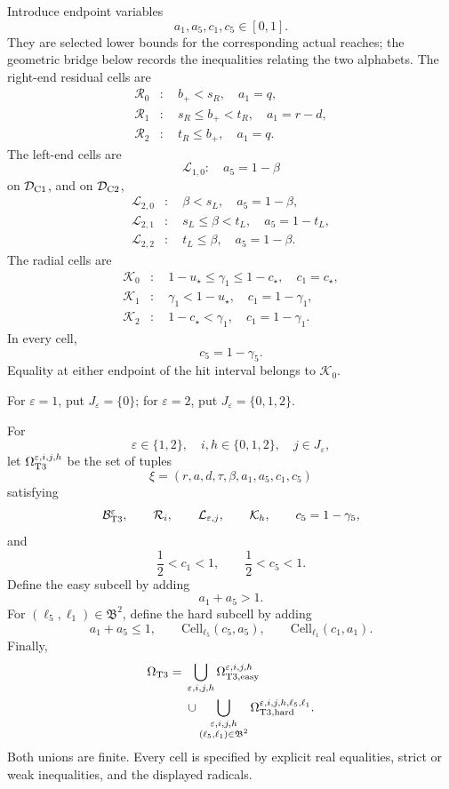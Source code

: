 Introduce endpoint variables
\[
 a_1,a_5,c_1,c_5\in[0,1].
\]
They are selected lower bounds for the corresponding actual reaches; the
geometric bridge below records the inequalities relating the two alphabets.
The right-end residual cells are
\[
 \begin{aligned}
 \mathcal R_0&:\quad b_+<s_R,\quad a_1=q,\\
 \mathcal R_1&:\quad s_R\le b_+<t_R,\quad a_1=r-d,\\
 \mathcal R_2&:\quad t_R\le b_+,\quad a_1=q.
 \end{aligned}
\]
The left-end cells are
\[
 \mathcal L_{1,0}:\quad a_5=1-\beta
\]
on \(\mathcal D_{\rm C1}\), and on \(\mathcal D_{\rm C2}\),
\[
 \begin{aligned}
 \mathcal L_{2,0}&:\quad \beta<s_L,\quad a_5=1-\beta,\\
 \mathcal L_{2,1}&:\quad s_L\le\beta<t_L,\quad a_5=1-t_L,\\
 \mathcal L_{2,2}&:\quad t_L\le\beta,\quad a_5=1-\beta.
 \end{aligned}
\]
The radial cells are
\[
 \begin{aligned}
 \mathcal K_0&:\quad
 1-u_\star\le\gamma_1\le1-c_\star,\quad c_1=c_\star,\\
 \mathcal K_1&:\quad
 \gamma_1<1-u_\star,\quad c_1=1-\gamma_1,\\
 \mathcal K_2&:\quad
 1-c_\star<\gamma_1,\quad c_1=1-\gamma_1.
 \end{aligned}
\]
In every cell,
\[
 c_5=1-\gamma_5.
\]
Equality at either endpoint of the hit interval belongs to \(\mathcal K_0\).

For \(\varepsilon=1\), put \(J_\varepsilon=\{0\}\); for
\(\varepsilon=2\), put \(J_\varepsilon=\{0,1,2\}\).

\begin{definition}
\label{def:s2-t3-finite-union}
For
\[
 \varepsilon\in\{1,2\},\quad
 i,h\in\{0,1,2\},\quad
 j\in J_\varepsilon,
\]
let \(\Omega_{\rm T3}^{\varepsilon,i,j,h}\) be the set of tuples
\[
 \xi=(r,a,d,\tau,\beta,a_1,a_5,c_1,c_5)
\]
satisfying
\[
 \mathcal B_{\rm T3}^{\varepsilon},
 \qquad
 \mathcal R_i,\qquad
 \mathcal L_{\varepsilon,j},\qquad
 \mathcal K_h,\qquad
 c_5=1-\gamma_5,
\]
and
\[
 \frac12<c_1<1,\qquad
 \frac12<c_5<1.
\]
Define the easy subcell by adding
\[
 a_1+a_5>1.
\]
For \((\ell_5,\ell_1)\in\mathfrak B^2\), define the hard subcell by adding
\[
 a_1+a_5\le1,\qquad
 \mathrm{Cell}_{\ell_5}(c_5,a_5),\qquad
 \mathrm{Cell}_{\ell_1}(c_1,a_1).
\]
Finally,
\[
 \begin{aligned}
 \Omega_{\rm T3}
 ={}&
 \bigcup_{\substack{\varepsilon,i,j,h}}
 \Omega_{\rm T3,easy}^{\varepsilon,i,j,h}\\
 &{}\cup
 \bigcup_{\substack{\varepsilon,i,j,h\\
                     (\ell_5,\ell_1)\in\mathfrak B^2}}
 \Omega_{\rm T3,hard}^{\varepsilon,i,j,h,\ell_5,\ell_1}.
 \end{aligned}
\]
Both unions are finite.  Every cell is specified by explicit real equalities,
strict or weak inequalities, and the displayed radicals.
\end{definition}

